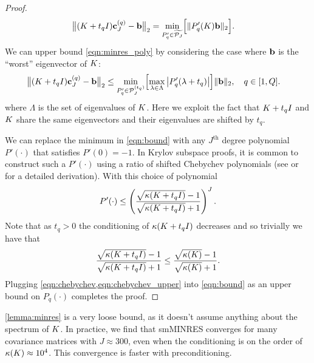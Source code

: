\begin{proof}
\begin{align}
    \bigl\Vert (K + t_q I) \mathbf{c}_J^{(q)} - \mathbf{b} \bigr\Vert_2
    &= \min_{P'_q \in \widetilde{\mathcal{P}_J}} \Bigl[
      \Vert P'_q(K) \mathbf{b} \Vert_2
    \Bigr].
    \label{eqn:minres_poly}
  \end{align}
  We can upper bound \cref{eqn:minres_poly} by considering the case where $\mathbf{b}$ is the ``worst'' eigenvector of $K$:
  \begin{align}
    \bigl\Vert (K + t_q I) \mathbf{c}_J^{(q)} - \mathbf{b} \bigr\Vert_2
    &\leq \min_{P'_q \in \mathcal{P}^{(t_q)}_J} \Bigl[
      \max_{\lambda \in \Lambda}
      \left\vert P'_q(\lambda + t_q) \right\vert
    \Bigr] \Vert \mathbf{b} \Vert_2,
    \quad
    q \in [1, Q].
    \label{eqn:bound}
	\end{align}
  where $\Lambda$ is the set of eigenvalues of $K$.
  Here we exploit the fact that $K + t_q I$ and $K$ share the same eigenvectors and their eigenvalues are shifted by $t_q$.

  We can replace the minimum in \cref{eqn:bound} with any $J^\text{th}$ degree polynomial $P'(\cdot)$ that satisfies $P'(0) = -1$.
  In Krylov subspace proofs, it is common to construct such a $P'(\cdot)$ using a ratio of shifted Chebychev polynomials (see \citep[e.g.][Sec. 9.2]{shewchuk1994introduction} or \citep[e.g.][Thm. 38.5]{trefethen1997numerical} for a detailed derivation).
  With this choice of polynomial
  \begin{equation}
    P'(\cdot)
    \leq \left( \frac{
      \sqrt{\kappa(K + t_q I)} - 1
    }{
      \sqrt{\kappa(K + t_q I)} + 1
    }\right)^J.
    \label{eqn:chebychev}
  \end{equation}
  Note that as $t_q > 0$ the conditioning of $\kappa(K + t_q I)$ decreases and so trivially we have that
  \begin{equation}
    \frac{
      \sqrt{\kappa(K + t_q I)} - 1
    }{
      \sqrt{\kappa(K + t_q I)} + 1
    }
    \leq
    \frac{
      \sqrt{\kappa(K)} - 1
    }{
      \sqrt{\kappa(K)} + 1
    }.
    \label{eqn:chebychev_upper}
  \end{equation}
  Plugging \cref{eqn:chebychev,eqn:chebychev_upper} into \cref{eqn:bound} as an upper bound on $P_q(\cdot)$ completes the proof.
\end{proof}

\cref{lemma:minres} is a very loose bound, as it doesn't assume anything about the spectrum of $K$.
In practice, we find that smMINRES converges for many covariance matrices with $J \approx 300$, even when the conditioning is on the order of $\kappa(K) \approx 10^4$.
This convergence is faster with preconditioning.





